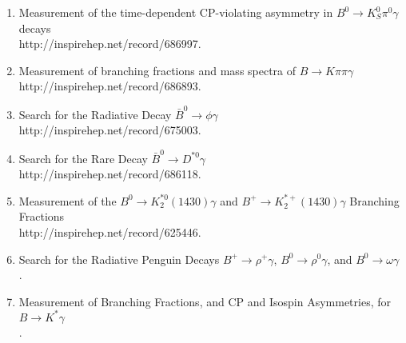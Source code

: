 \documentclass [12pt]{report}
\begin{document}
\begin{enumerate}
\item Measurement of the time-dependent CP-violating asymmetry in $B^0 \rightarrow K^{0}_{S}\pi^0\gamma$ decays\\
{http://inspirehep.net/record/686997}.

\item Measurement of branching fractions and mass spectra of $B \rightarrow K \pi \pi \gamma$\\
{http://inspirehep.net/record/686893}.

\item Search for the Radiative Decay $\bar{B}^{0}\rightarrow \phi\gamma$\\
{http://inspirehep.net/record/675003}.

\item Search for the Rare Decay $\bar{B}^{0}\rightarrow D^{*0}\gamma$\\
{http://inspirehep.net/record/686118}.

\item Measurement of the $B^{0}\rightarrow K_{2}^{*0}(1430) \gamma$ and $B^{+}\rightarrow K_{2}^{*+}(1430) \gamma$ Branching Fractions\\
{http://inspirehep.net/record/625446}.

\item Search for the Radiative Penguin Decays $B^{+}
\rightarrow \rho^{+} \gamma$, $B^{0}
\rightarrow \rho^{0} \gamma$, and $B^{0}
\rightarrow \omega \gamma$\\
.

\item Measurement of Branching Fractions, and CP and Isospin Asymmetries, for $B\rightarrow K^{*}\gamma$\\
.


\end{enumerate}
\end{document}
